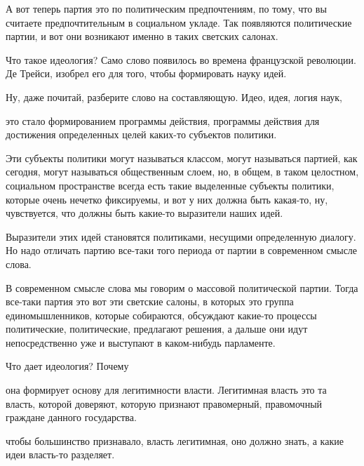 А вот теперь партия это по политическим предпочтениям, по
тому, что вы считаете предпочтительным в социальном укладе. Так появляются
политические партии, и вот они возникают именно в таких светских салонах. 

Что такое идеология? Само слово появилось во времена французской
революции. Де Трейси, изобрел его для того, чтобы
формировать науку идей. 

Ну, даже почитай, разберите слово на составляющую. Идео,
идея, логия наук, 



это стало
формированием программы действия, программы действия для достижения определенных
целей каких-то субъектов политики. 

Эти субъекты политики могут называться
классом, могут называться партией, как сегодня, могут называться общественным
слоем, но, в общем, в таком целостном, социальном пространстве всегда есть такие
выделенные субъекты политики, которые очень нечетко фиксируемы, и вот у них
должна быть какая-то, ну, чувствуется, что должны быть какие-то выразители наших
идей. 

Выразители этих идей становятся политиками, несущими определенную диалогу.
Но надо отличать партию все-таки того периода от партии в современном смысле
слова. 

В современном смысле слова мы говорим о массовой политической партии.
Тогда все-таки партия это вот эти светские салоны, в которых это группа
единомышленников, которые собираются, обсуждают какие-то процессы политические,
политические, предлагают решения, а дальше они идут непосредственно уже и
выступают в каком-нибудь парламенте. 

Что дает идеология? Почему

она формирует
основу для легитимности власти. Легитимная власть это та власть, которой доверяют,
которую признают правомерный, правомочный граждане данного государства. 


чтобы большинство признавало, власть легитимная, оно должно
знать, а какие идеи власть-то разделяет. 

